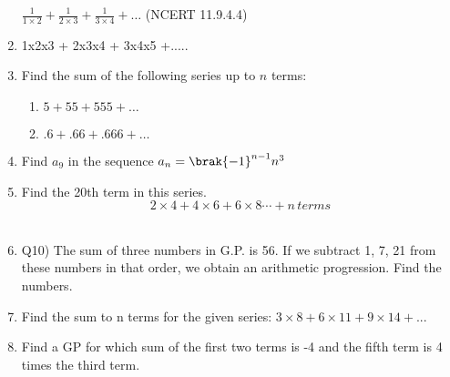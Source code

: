 \begin{enumerate}[label=\thesection.\arabic*,ref=\thesection.\theenumi]
$\frac{1}{1 \times 2} + \frac{1}{2 \times 3} + \frac{1}{3 \times 4} + \ldots$ \hfill(NCERT 11.9.4.4)
\solution
\pagebreak
\item 1x2x3 + 2x3x4 + 3x4x5 +..... \\
\solution
\pagebreak
\item  Find the sum of the following series up to \(n\) terms:
          \begin{enumerate}
              \item $5 + 55 + 555 + \ldots$
              \item  $.6 + .66 + .666 + \ldots$
        \end{enumerate}

\solution
\pagebreak
\item Find $a_{9}$ in the sequence $a_{n}=\brak{-1}^{n-1}n^{3}$ \\
\solution
\pagebreak
\item Find the 20th term in this series.\\
$$2\times4+4\times6+6\times8\cdots+n\,terms$$ \\
\solution
\pagebreak

\item Q10) The sum of three numbers in G.P. is 56. If we subtract 1, 7, 21 from these numbers in that order, we obtain an arithmetic progression. Find the numbers.\\
\solution
\item  Find the sum to n terms for the given series: $3\times8 + 6\times11 + 9\times14 + ...$
\solution
\pagebreak
\item Find a GP for which sum of the first two terms is -4 and the fifth term is 4 times the third term.\\
\solution

\pagebreak
\end{enumerate}
